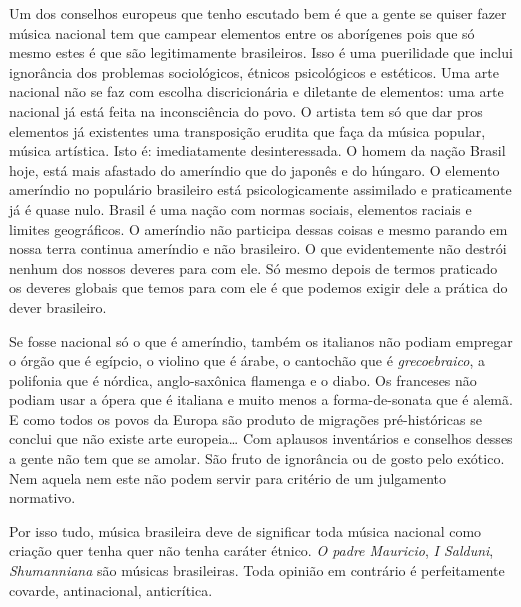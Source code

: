 Um dos conselhos europeus que tenho escutado bem é que a gente se quiser
fazer música nacional tem que campear elementos entre os aborígenes pois
que só mesmo estes é que são legitimamente brasileiros. Isso é uma
puerilidade que inclui ignorância dos problemas sociológicos, étnicos
psicológicos e estéticos. Uma arte nacional não se faz com escolha
discricionária e diletante de elementos: uma arte nacional já está feita
na inconsciência do povo. O artista tem só que dar pros elementos já
existentes uma transposição erudita que faça da música popular, música
artística. Isto é: imediatamente desinteressada. O homem da nação Brasil
hoje, está mais afastado do ameríndio que do japonês e do húngaro. O
elemento ameríndio no populário brasileiro está psicologicamente
assimilado e praticamente já é quase nulo. Brasil é uma nação com normas
sociais, elementos raciais e limites geográficos. O ameríndio não
participa dessas coisas e mesmo parando em nossa terra continua
ameríndio e não brasileiro. O que evidentemente não destrói nenhum dos
nossos deveres para com ele. Só mesmo depois de termos praticado os
deveres globais que temos para com ele é que podemos exigir dele a
prática do dever brasileiro.

Se fosse nacional só o que é ameríndio, também os italianos não podiam
empregar o órgão que é egípcio, o violino que é árabe, o cantochão que é
\textit{grecoebraico}, a polifonia que é nórdica, anglo-saxônica flamenga e o
diabo. Os franceses não podiam usar a ópera que é italiana e muito menos
a forma-de-sonata que é alemã. E como todos os povos da Europa são
produto de migrações pré-históricas se conclui que não existe arte
europeia\ldots{} Com aplausos inventários e conselhos desses a gente não tem
que se amolar. São fruto de ignorância ou de gosto pelo exótico. Nem
aquela nem este não podem servir para critério de um julgamento
normativo.

Por isso tudo, música brasileira deve de significar toda música nacional
como criação quer tenha quer não tenha caráter étnico. \textit{O padre Mauricio},
\textit{I Salduni}, \textit{Shumanniana} são músicas brasileiras. Toda opinião em
contrário é perfeitamente covarde, antinacional, anticrítica.


